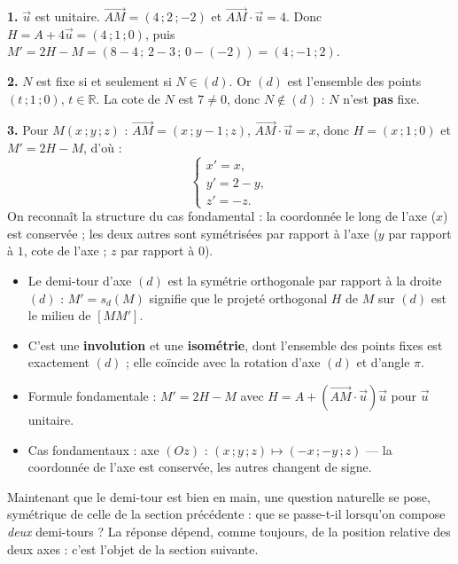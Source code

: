 \documentclass[11pt]{article}
\newcommand{\cle}[1]{{\popxbold\color{popdark}#1}}
\begin{document}
\begin{corrige}
\textbf{1.} $\vec{u}$ est unitaire. $\overrightarrow{AM} = (4\,;2\,;-2)$ et $\overrightarrow{AM}\cdot\vec{u} = 4$. Donc $H = A + 4\vec{u} = (4\,;1\,;0)$, puis $M' = 2H - M = (8-4\,;\,2-3\,;\,0-(-2)) = (4\,;-1\,;2)$.

\textbf{2.} $N$ est fixe si et seulement si $N \in (d)$. Or $(d)$ est l'ensemble des points $(t\,;1\,;0)$, $t \in \mathbb{R}$. La cote de $N$ est $7 \neq 0$, donc $N \notin (d)$ : $N$ n'est \textbf{pas} fixe.

\textbf{3.} Pour $M(x\,;y\,;z)$ : $\overrightarrow{AM} = (x\,;y-1\,;z)$, $\overrightarrow{AM}\cdot\vec{u} = x$, donc $H = (x\,;1\,;0)$ et $M' = 2H - M$, d'où :
\[
\begin{cases}
x' = x,\\
y' = 2 - y,\\
z' = -z.
\end{cases}
\]
On reconnaît la structure du cas fondamental : la coordonnée le long de l'axe ($x$) est conservée ; les deux autres sont symétrisées par rapport à l'axe ($y$ par rapport à $1$, cote de l'axe ; $z$ par rapport à $0$).
\end{corrige}

\begin{aretenir}
\begin{itemize}
\item Le \cle{demi-tour} d'axe $(d)$ est la symétrie orthogonale par rapport à la droite $(d)$ : $M' = s_d(M)$ signifie que le projeté orthogonal $H$ de $M$ sur $(d)$ est le milieu de $[MM']$.
\item C'est une \textbf{involution} et une \textbf{isométrie}, dont l'ensemble des points fixes est exactement $(d)$ ; elle coïncide avec la rotation d'axe $(d)$ et d'angle $\pi$.
\item Formule fondamentale : $M' = 2H - M$ avec $H = A + \left(\overrightarrow{AM}\cdot\vec{u}\right)\vec{u}$ pour $\vec{u}$ unitaire.
\item Cas fondamentaux : axe $(Oz)$ : $(x\,;y\,;z) \mapsto (-x\,;-y\,;z)$ — la coordonnée de l'axe est conservée, les autres changent de signe.
\end{itemize}
\end{aretenir}

Maintenant que le demi-tour est bien en main, une question naturelle se pose, symétrique de celle de la section précédente : que se passe-t-il lorsqu'on compose \emph{deux} demi-tours ? La réponse dépend, comme toujours, de la position relative des deux axes : c'est l'objet de la section suivante.
\end{document}
